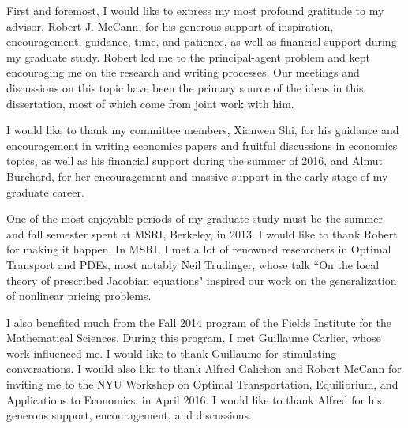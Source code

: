 \documentclass{ut-thesis}[10pt]
\theoremstyle{plain}
\theoremstyle{definition}
\theoremstyle{remark}
\numberwithin{equation}{section}
\begin{document}
\begin{preliminary}

\begin{acknowledgements}

First and foremost, I would like to express my most profound gratitude to my advisor, Robert J. McCann, for his generous support of inspiration, encouragement, guidance, time, and patience, as well as financial support during my graduate study. Robert led me to the principal-agent problem and kept encouraging me on the research and writing processes. Our meetings and discussions on this topic have been the primary source of the ideas in this dissertation, most of which come from joint work with him.\medskip

I would like to thank my committee members, Xianwen Shi, for his guidance and encouragement in writing economics papers and fruitful discussions in economics topics, as well as his financial support during the summer of 2016, and Almut Burchard, for her encouragement and massive support in the early stage of my graduate career.\medskip

One of the most enjoyable periods of my graduate study must be the summer and fall semester spent at MSRI, Berkeley, in 2013. I would like to thank Robert for making it happen. In MSRI, I met a lot of renowned researchers in Optimal Transport and PDEs, %
most notably Neil Trudinger, whose talk ``On the local theory of prescribed Jacobian equations" inspired our work on the generalization of nonlinear pricing problems.    \medskip

I also benefited much from the Fall 2014 program of the Fields Institute for the Mathematical Sciences. During this program, I met Guillaume Carlier, whose work influenced me. I would like to thank Guillaume for stimulating conversations. I would also like to thank Alfred Galichon and Robert McCann for inviting me to the NYU Workshop on Optimal Transportation, Equilibrium, and Applications to Economics, in April 2016. I would like to thank Alfred for his generous support, encouragement, and discussions.\medskip


\end{acknowledgements}
\end{preliminary}
\end{document}

